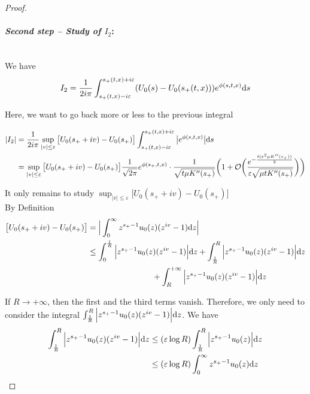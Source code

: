 \documentclass[11pt]{amsart}
\begin{document}
\begin{proof}
\medskip
\paragraph{\textit{Second step -- Study of $I_2$}:}\mbox{}\\
We have 
    \begin{equation*}
        I_2 = \frac{1}{2i \pi} \int_{s_+(t,x) - i\varepsilon}^{s_+(t,x) + i\varepsilon} (U_0(s) -  U_0(s_+(t,x)))  e^{\phi(s,t,x)} \mathrm ds 
    \end{equation*}
    
Here, we want to go back more or less to the previous integral

    \begin{align*}
         |I_2| 
         &= 
         \frac{1}{2i \pi} \sup_{|v| \leq \varepsilon} \big[U_0(s_+ + iv) -  U_0(s_+) \big] \int_{s_+(t,x) - i\varepsilon}^{s_+(t,x) + i\varepsilon} \big| e^{\phi(s,t,x)} \big| \mathrm ds \\
         &=
         \sup_{|v| \leq \varepsilon} \big[U_0(s_+ + iv) -  U_0(s_+) \big] \frac{1}{\sqrt{2\pi}} e^{\phi(s_+, t, x)} \cdot \frac{1}{\sqrt{t \mu K''(s_+)}} \bigg( 
    1 + \mathcal{O}\bigg(\frac{e^{-\frac{t(\varepsilon^2 \mu K''(s_+))}{2}} }{\varepsilon \sqrt{\mu tK''(s_+)}}\bigg) \bigg)
    \end{align*}
    
It only remains to study $  \sup_{|v| \leq \varepsilon} \big[U_0(s_+ + iv) -  U_0(s_+) \big]$ \\

By Definition
\begin{align*}
    \big[U_0(s_+ + iv) -  U_0(s_+) \big]
    &= \Big| \int_0^\infty  z^{s_+ - 1}u_0(z) (z^{iv} - 1) \mathrm dz \Big| \\
    &\leq \int_0^{\frac{1}{R}} \Big|  z^{s_+ - 1}u_0(z) (z^{iv} - 1) \Big| \mathrm dz
        + \int_{\frac{1}{R}}^R \Big|  z^{s_+ - 1}u_0(z) (z^{iv} - 1) \Big| \mathrm dz \\
        &\qquad \qquad \qquad \qquad
        + \int_R^{+\infty} \Big|  z^{s_+ - 1}u_0(z) (z^{iv} - 1) \Big| \mathrm dz \\
\end{align*}

If $R \to + \infty$, then the first and the third terms vanish. Therefore, we only need to consider the integral $ \int_{\frac{1}{R}}^R \Big|  z^{s_+ - 1}u_0(z) (z^{iv} - 1) \Big| \mathrm dz$. We have
    \begin{align*}
         \int_{\frac{1}{R}}^R \Big|  z^{s_+ - 1}u_0(z) (z^{iv} - 1) \Big| \mathrm dz 
         &\leq 
          (\varepsilon \log R)\int_{\frac{1}{R}}^R \Big|  z^{s_+ - 1}u_0(z) \Big| \mathrm dz \\
         &\leq 
          (\varepsilon \log R)\int_{0}^{\infty} z^{s_+ - 1}u_0(z)  \mathrm dz \\
    \end{align*}


\end{proof}
\end{document}
